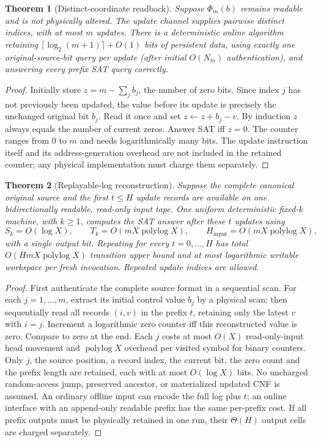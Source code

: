 \documentclass[11pt]{article}
\newtheorem{theorem}{Theorem}
\newcommand{\polylog}{\operatorname{polylog}}
\begin{document}
\begin{theorem}[Distinct-coordinate readback]\label{thm:distinct}
Suppose $\Phi_m(b)$ remains readable and is not physically altered.
The update channel supplies pairwise distinct indices, with at most $m$
updates.  There is a deterministic online algorithm retaining
$\lceil\log_2(m+1)\rceil+O(1)$ bits of persistent data,
using exactly one original-source-bit query per update (after initial
$O(N_m)$ authentication), and answering every prefix SAT query correctly.
\end{theorem}
\begin{proof}
Initially store $z=m-\sum_j b_j$, the number of zero bits.  Since index
$j$ has not previously been updated, the value before its update is
precisely the unchanged original bit $b_j$.  Read it once and set
$z\leftarrow z+b_j-v$.  By induction $z$ always equals the number of
current zeros.  Answer SAT iff $z=0$.  The counter ranges from $0$ to $m$
and needs logarithmically many bits.  The update instruction itself and
its address-generation overhead are not included in the retained counter;
any physical implementation must charge them separately.
\end{proof}

\begin{theorem}[Replayable-log reconstruction]\label{thm:replay}
Suppose the complete canonical original source and the first $t\le H$
update records are available on one bidirectionally readable,
read-only input tape.  One uniform deterministic fixed-$k$ machine, with
$k\ge1$, computes the SAT answer after these $t$ updates using
\begin{equation}
S_k=O(\log X),\qquad T_k=O(mX\polylog X),
\qquad H_{\mathrm{input}}=O(mX\polylog X),
\label{eq:replay}
\end{equation}
with a single output bit.  Repeating for every $t=0,\dots,H$ has total
$O(HmX\polylog X)$ transition upper bound and at most logarithmic
writable workspace per fresh invocation.  Repeated update indices are allowed.
\end{theorem}
\begin{proof}
First authenticate the complete source format in a sequential scan.
For each $j=1,\dots,m$, extract its initial control value $b_j$ by a
physical scan; then sequentially read all records $(i,v)$ in the prefix
$t$, retaining only the latest $v$ with $i=j$.  Increment a logarithmic
zero counter iff this reconstructed value is zero.  Compare to zero at
the end.  Each $j$ costs at most $O(X)$ read-only-input head movement
and $\polylog X$ overhead per visited symbol for binary counters.
Only $j$, the source position, a record index, the current bit, the zero
count and the prefix length are retained, each with at most $O(\log X)$
bits.  No uncharged random-access jump, preserved ancestor, or materialized
updated CNF is assumed.  An ordinary offline input can encode the full
log plus $t$; an online interface with an append-only readable prefix has
the same per-prefix cost.  If all prefix outputs must be physically
retained in one run, their $\Theta(H)$ output cells are charged separately.
\end{proof}
\end{document}
